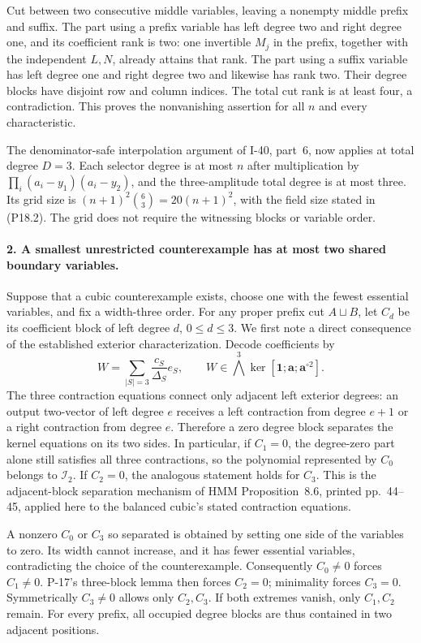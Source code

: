 Cut between two consecutive middle variables, leaving a
nonempty middle prefix and suffix. The part using a prefix
variable has left degree two and right degree one, and its
coefficient rank is two: one invertible $M_j$ in the prefix,
together with the independent $L,N$, already attains that
rank. The part using a suffix variable has left degree one
and right degree two and likewise has rank two. Their degree
blocks have disjoint row and column indices. The total cut
rank is at least four, a contradiction. This proves the
nonvanishing assertion for all $n$ and every characteristic.

The denominator-safe interpolation argument of I-40, part~6,
now applies at total degree $D=3$. Each selector degree is at
most $n$ after multiplication by
$\prod_i(a_i-y_1)(a_i-y_2)$, and the three-amplitude total
degree is at most three. Its grid size is
$(n+1)^2\binom{6}{3}=20(n+1)^2$, with the field size stated
in (P18.2). The grid does not require the witnessing blocks
or variable order.

\paragraph{2. A smallest unrestricted counterexample has at most two shared boundary variables.}
Suppose that a cubic counterexample exists, choose one with
the fewest essential variables, and fix a width-three order.
For any proper prefix cut $A\sqcup B$, let $C_d$ be its
coefficient block of left degree $d$, $0\le d\le3$.
We first note a direct consequence of the established exterior
characterization. Decode coefficients by
\[
 W=\sum_{|S|=3}\frac{c_S}{\Delta_S}e_S,
 \qquad
 W\in\bigwedge^3\ker[\mathbf1;\mathbf a;\mathbf a^{\circ2}].
 \tag{P18.6}
\]
The three contraction equations connect only adjacent left
exterior degrees: an output two-vector of left degree $e$
receives a left contraction from degree $e+1$ or a right
contraction from degree $e$. Therefore a zero degree block
separates the kernel equations on its two sides. In particular,
if $C_1=0$, the degree-zero part alone still satisfies all three
contractions, so the polynomial represented by $C_0$ belongs
to $\mathcal I_2$. If $C_2=0$, the analogous statement holds
for $C_3$. This is the adjacent-block separation mechanism
of HMM Proposition~8.6, printed pp.~44--45, applied here to
the balanced cubic's stated contraction equations.

A nonzero $C_0$ or $C_3$ so separated is obtained by setting
one side of the variables to zero. Its width cannot increase,
and it has fewer essential variables, contradicting the
choice of the counterexample. Consequently $C_0\ne0$ forces
$C_1\ne0$. P-17's three-block lemma then forces $C_2=0$;
minimality forces $C_3=0$. Symmetrically $C_3\ne0$ allows
only $C_2,C_3$. If both extremes vanish, only $C_1,C_2$ remain.
For every prefix, all occupied degree blocks are thus contained
in two adjacent positions.

